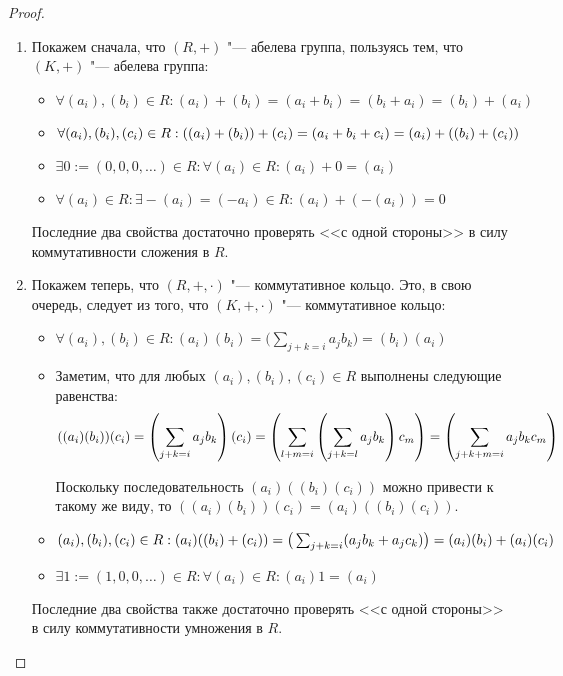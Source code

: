 \begin{proof}~
	\begin{enumerate}
		\item Покажем сначала, что $(R, +)$ "--- абелева группа, пользуясь тем, что $(K, +)$ "--- абелева группа:
		\begin{itemize}
			\item $\forall (a_i), (b_i) \in R: (a_i) + (b_i) = (a_i + b_i) = (b_i + a_i) = (b_i) + (a_i)$
			\item $\forall (a_i), (b_i), (c_i) \in R:  ((a_i) + (b_i)) + (c_i) = (a_i + b_i + c_i) \hm{=} (a_i) + ((b_i) + (c_i))$
			\item $\exists 0 := (0, 0, 0, \dots) \in R: \forall (a_i) \in R: (a_i) + 0 = (a_i)$
			\item $\forall (a_i) \in R: \exists\! -(a_i) = (-a_i) \in R: (a_i) + (-(a_i)) = 0$
		\end{itemize}
	
		Последние два свойства достаточно проверять <<с одной стороны>> в силу коммутативности сложения в $R$.
		
		\item Покажем теперь, что $(R, +, \cdot)$ "--- коммутативное кольцо. Это, в свою очередь, следует из того, что $(K, +, \cdot)$ "--- коммутативное кольцо:
		\begin{itemize}
			\item $\forall (a_i), (b_i) \in R: (a_i)(b_i) = \big(\sum_{j + k = i}a_jb_k\big) = (b_i)(a_i)$
			
			\item Заметим, что для любых $(a_i), (b_i), (c_i) \in R$ выполнены следующие равенства:
			\[((a_i)(b_i))(c_i) = \left(\sum_{j + k = i}a_jb_k\right)(c_i) = \left(\sum_{l + m = i}\left(\sum_{j + k = l}a_jb_k\right)c_m\right) \hm{=} \left(\sum_{j+k+m = i}a_jb_kc_m\right)\]
			
			Поскольку последовательность $(a_i)((b_i)(c_i))$ можно привести к такому же виду, то $((a_i)(b_i))(c_i) = (a_i)((b_i)(c_i))$.
			\item $(a_i), (b_i), (c_i) \in R: (a_i)((b_i) + (c_i)) = \big(\sum_{j + k = i}(a_jb_k + a_jc_k)\big) \hm{=} (a_i)(b_i) + (a_i)(c_i)$
			\item $\exists 1 := (1, 0, 0, \dots) \in R: \forall (a_i) \in R: (a_i)1 = (a_i)$
		\end{itemize}
	
		Последние два свойства также достаточно проверять <<с одной стороны>> в силу коммутативности умножения в $R$.\qedhere
	\end{enumerate}
\end{proof}

